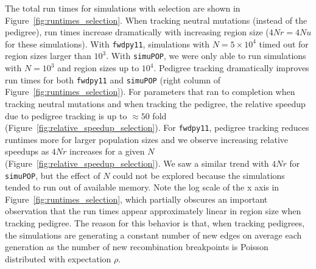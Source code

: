 \documentclass{article}
\newcommand{\simupop}{\texttt{simuPOP}}
\newcommand{\fwdpy}{\texttt{fwdpy11}}
\begin{document}
The total run times for simulations with selection are shown in Figure~\ref{fig:runtimes_selection}.  When tracking
neutral mutations (instead of the pedigree), run times increase dramatically with increasing region size ($4Nr = 4Nu$ for
these simulations).  With \fwdpy{}, simulations with $N=5 \times 10^4$ timed out for region sizes larger than $10^3$.
With \simupop{}, we were only able to run simulations with $N=10^3$ and region sizes up to $10^4$.  Pedigree tracking
dramatically improves run times for both \fwdpy{} and \simupop{} (right column of Figure~\ref{fig:runtimes_selection}).  For parameters that ran to completion when tracking neutral mutations and when tracking
the pedigree, the relative speedup due to pedigree tracking is up to $\approx 50$ fold
(Figure~\ref{fig:relative_speedup_selection}).  For \fwdpy{}, pedigree tracking reduces runtimes more for larger
population sizes and we observe increasing relative speedups as $4Nr$ increases for a given $N$
(Figure~\ref{fig:relative_speedup_selection}).  We saw a similar trend with $4Nr$ for \simupop{}, but the effect of $N$
could not be explored because the simulations tended to run out of available memory.
  Note the log scale of the x axis in Figure~\ref{fig:runtimes_selection}, which
partially obscures an important observation that the run times appear approximately linear in region size when tracking
pedigree.  The reason for this behavior is that, when tracking pedigrees, the simulations are generating a constant number of new edges on
average
each generation as the number of new recombination breakpoints is Poisson distributed with expectation $\rho$.
\end{document}
